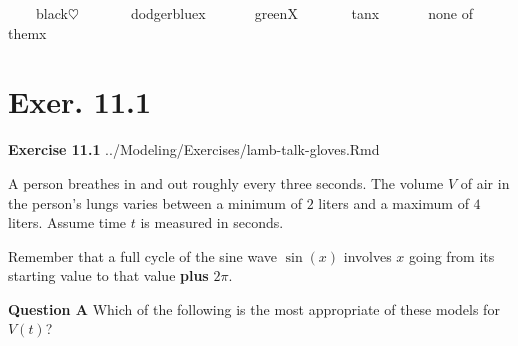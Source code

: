 \documentclass[
  letterpaper,
  DIV=11,
  numbers=noendperiod,
  oneside]{article}
\begin{document}
\begin{multicols}{2}
\begin{table}
\begin{minipage}[t]{\linewidth}
{~~~~{black{\(\heartsuit\ \)}}~~~~~~~{dodgerblue{x}}~~~~~~~{green{︎X
}}~~~~~~~{tan{x}}~~~~~~~{none of them{x}}

}

\end{minipage}%
\newline
\begin{minipage}[t]{\linewidth}

{\centering 

\hypertarget{exer.-11.1-1}{%
\section*{Exer. 11.1}\label{exer.-11.1-1}}

\textbf{Exercise 11.1} ../Modeling/Exercises/lamb-talk-gloves.Rmd

}

\end{minipage}%
\newline
\begin{minipage}[t]{\linewidth}

{\centering 

A person breathes in and out roughly every three seconds. The volume
\(V\) of air in the person's lungs varies between a minimum of \(2\)
liters and a maximum of \(4\) liters. Assume time \(t\) is measured in
seconds.

}

\end{minipage}%
\newline
\begin{minipage}[t]{\linewidth}

{\centering 

Remember that a full cycle of the sine wave \(\sin(x)\) involves \(x\)
going from its starting value to that value \textbf{plus} \(2 \pi\).

}

\end{minipage}%
\newline
\begin{minipage}[t]{\linewidth}

{\centering 

\textbf{Question A} Which of the following is the most appropriate of
these models for \(V(t)\)?

}
\end{minipage}
\end{table}
\end{multicols}
\end{document}
